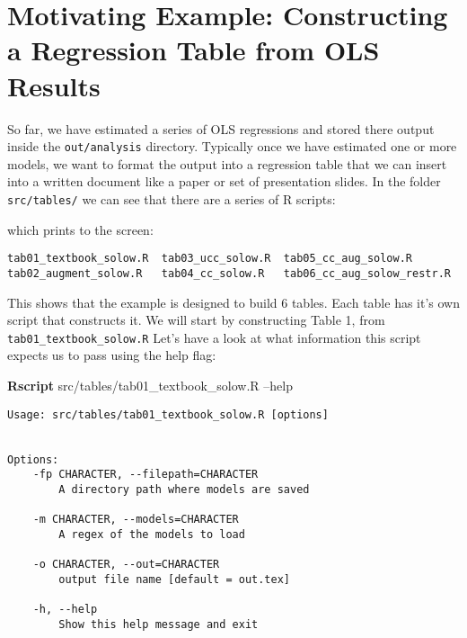 \documentclass[]{book}
\newenvironment{Shaded}{\begin{snugshade}}{\end{snugshade}}
\newcommand{\KeywordTok}[1]{\textcolor[rgb]{0.13,0.29,0.53}{\textbf{{#1}}}}
\newcommand{\NormalTok}[1]{{#1}}
\theoremstyle{definition}
\theoremstyle{definition}
\theoremstyle{definition}
\theoremstyle{remark}
\begin{document}
\section{Motivating Example: Constructing a Regression Table from OLS
Results}\label{motivating-example-constructing-a-regression-table-from-ols-results}

So far, we have estimated a series of OLS regressions and stored there
output inside the \texttt{out/analysis} directory. Typically once we
have estimated one or more models, we want to format the output into a
regression table that we can insert into a written document like a paper
or set of presentation slides. In the folder \texttt{src/tables/} we can
see that there are a series of R scripts:

\begin{Shaded}
\end{Shaded}

which prints to the screen:

\begin{verbatim}
tab01_textbook_solow.R  tab03_ucc_solow.R  tab05_cc_aug_solow.R
tab02_augment_solow.R   tab04_cc_solow.R   tab06_cc_aug_solow_restr.R
\end{verbatim}

This shows that the example is designed to build 6 tables. Each table
has it's own script that constructs it. We will start by constructing
Table 1, from \texttt{tab01\_textbook\_solow.R} Let's have a look at
what information this script expects us to pass using the help flag:

\begin{Shaded}
\begin{Highlighting}[]
\KeywordTok{Rscript} \NormalTok{src/tables/tab01_textbook_solow.R --help}
\end{Highlighting}
\end{Shaded}

\begin{verbatim}
Usage: src/tables/tab01_textbook_solow.R [options]


Options:
    -fp CHARACTER, --filepath=CHARACTER
        A directory path where models are saved

    -m CHARACTER, --models=CHARACTER
        A regex of the models to load

    -o CHARACTER, --out=CHARACTER
        output file name [default = out.tex]

    -h, --help
        Show this help message and exit
\end{verbatim}
\end{document}
